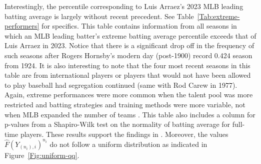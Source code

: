 \documentclass[12pt]{article}
\begin{document}
Interestingly, the percentile corresponding to Luis Arraez's 2023 MLB leading batting average is largely without recent precedent. See Table~\ref{Tab:extreme-performers} for specifics. This table contains information from all seasons in which an MLB leading batter's extreme batting average percentile exceeds that of Luis Arraez in 2023. Notice that there is a significant drop off in the frequency of such seasons after Rogers Hornsby's modern day (post-1900) record 0.424 season from 1924. It is also interesting to note that the four most recent seasons in this table are from international players or players that would not have been allowed to play baseball had segregation continued (same with Rod Carew in 1977). Again, extreme performances were more common when the talent pool was more restricted and batting strategies and training methods were more variable, not when MLB expanded the number of teams \citep{Gould96, DE20, DE20b, yan2025fullhouse-supplement}. This table also includes a column for p-values from a Shapiro-Wilk test \citep{shapiro1965analysis} on the normality of batting average for full-time players. These results support the findings in \cite{yan2025fullhouse-supplement}. Moreover, the values $\widehat{F}(Y_{(n_i),i})^{n_i}$ do not follow a uniform distribution as indicated in Figure~\ref{Fig:uniform-qq}.
 
\end{document}
